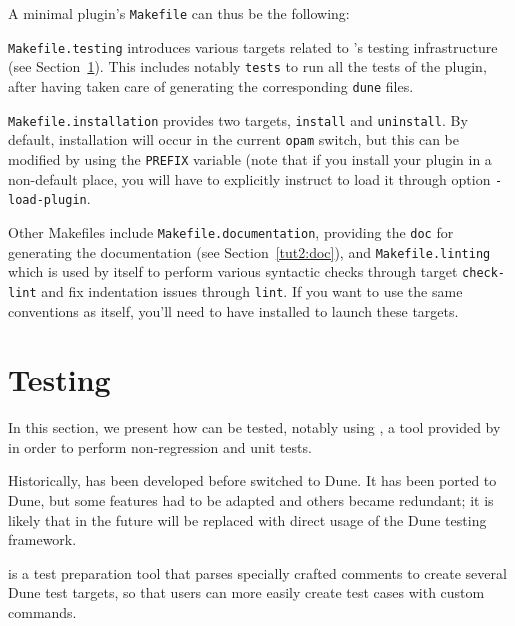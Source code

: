 A minimal plugin's \verb|Makefile| can thus be the following:


\texttt{Makefile.testing} introduces various targets related to \framac's
testing infrastructure (see Section~\ref{adv:ptests}). This includes notably
\texttt{tests} to run all the tests of the plugin, after having taken care of
generating the corresponding \texttt{dune} files.

\texttt{Makefile.installation} provides two targets, \texttt{install} and
\texttt{uninstall}. By default, installation will occur in the current
\texttt{opam} switch, but this can be modified by using the \texttt{PREFIX}
variable (note that if you install your plugin in a non-default place, you will
have to explicitly instruct \framac to load it through option
\texttt{-load-plugin}.

Other Makefiles include \texttt{Makefile.documentation}, providing the
\texttt{doc} for generating the documentation (see Section~\ref{tut2:doc}),
and \texttt{Makefile.linting} which is used
by \framac itself to perform various syntactic checks through target
\texttt{check-lint} and fix indentation issues through \texttt{lint}. If
you want to use the same conventions as \framac itself, you'll need to
have \ocpindent installed to launch these targets.



\section{Testing}\label{adv:ptests}

In this section, we present how \framac can be tested, notably using \ptests, a
tool provided by \framac in order to perform non-regression and unit tests.

\begin{important}
  Historically, \ptests has been developed before \framac switched to Dune.
  It has been ported to Dune, but some features had to be adapted and others
  became redundant; it is likely that in the future \ptests will be
  replaced with direct usage of the Dune testing framework.
\end{important}

\ptests{} is a test preparation tool that parses specially
crafted \C comments to create several Dune test targets, so that users can
more easily create test cases with custom \framac commands.

